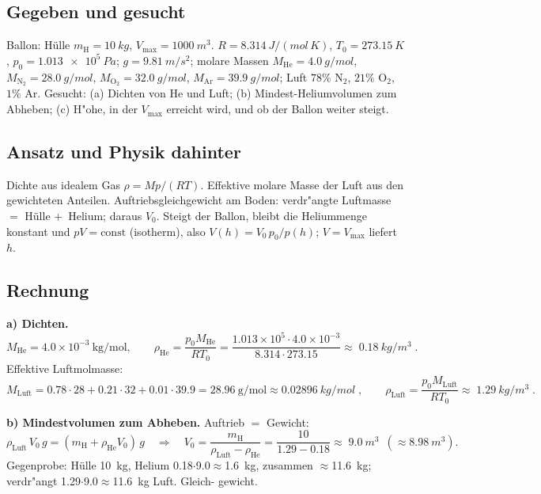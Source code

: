
\subsection*{Gegeben und gesucht}
Ballon: Hülle $m_{\mathrm{H}}=\qty{10}{kg}$, $V_{\max}=\qty{1000}{m^3}$.
$R=\qty{8.314}{J/(mol\,K)}$, $T_0=\qty{273.15}{K}$,
$p_0=\qty{1.013e5}{Pa}$; $g=\qty{9.81}{m/s^2}$; molare Massen
$M_{\mathrm{He}}=\qty{4.0}{g/mol}$, $M_{\mathrm{N}_2}=\qty{28.0}{g/mol}$,
$M_{\mathrm{O}_2}=\qty{32.0}{g/mol}$, $M_{\mathrm{Ar}}=\qty{39.9}{g/mol}$;
Luft $78\%$ N$_2$, $21\%$ O$_2$, $1\%$ Ar.
Gesucht: (a) Dichten von He und Luft; (b) Mindest-Heliumvolumen zum Abheben;
(c) H"ohe, in der $V_{\max}$ erreicht wird, und ob der Ballon weiter steigt.

\subsection*{Ansatz und Physik dahinter}
Dichte aus idealem Gas $\rho=Mp/(RT)$. Effektive molare Masse der Luft aus
den gewichteten Anteilen. Auftriebsgleichgewicht am Boden: verdr"angte
Luftmasse $=$ Hülle $+\,$ Helium; daraus $V_0$. Steigt der Ballon, bleibt die
Heliummenge konstant und $pV=\text{const}$ (isotherm), also
$V(h)=V_0\,p_0/p(h)$; $V=V_{\max}$ liefert $h$.

\subsection*{Rechnung}
\textbf{a) Dichten.}
\begin{equation}
  M_{\mathrm{He}}=4.0\times10^{-3}\ \mathrm{kg/mol},\qquad
  \rho_{\mathrm{He}}=\frac{p_0 M_{\mathrm{He}}}{R T_0}
  =\frac{1.013\times10^{5}\cdot4.0\times10^{-3}}{8.314\cdot273.15}
  \approx\boxed{\;\qty{0.18}{kg/m^3}\;}.
\end{equation}
Effektive Luftmolmasse:
\begin{equation}
  M_{\mathrm{Luft}}=0.78\cdot28+0.21\cdot32+0.01\cdot39.9
  =28.96\ \mathrm{g/mol}\approx\qty{0.02896}{kg/mol}\;,
  \qquad
  \rho_{\mathrm{Luft}}=\frac{p_0 M_{\mathrm{Luft}}}{R T_0}
  \approx\boxed{\;\qty{1.29}{kg/m^3}\;}.
\end{equation}

\textbf{b) Mindestvolumen zum Abheben.} Auftrieb $=$ Gewicht:
\begin{equation}
  \rho_{\mathrm{Luft}}\,V_0\,g=(m_{\mathrm{H}}+\rho_{\mathrm{He}}V_0)\,g
  \quad\Rightarrow\quad
  V_0=\frac{m_{\mathrm{H}}}{\rho_{\mathrm{Luft}}-\rho_{\mathrm{He}}}
  =\frac{10}{1.29-0.18}\approx\boxed{\;\qty{9.0}{m^3}\;}
  \ (\approx \qty{8.98}{m^3}).
\end{equation}
Gegenprobe: Hülle 10~kg, Helium 0.18$\cdot$9.0$\approx$1.6~kg, zusammen
$\approx$11.6~kg; verdr"angt 1.29$\cdot$9.0$\approx$11.6~kg Luft. Gleich-
gewicht. \checkmark

